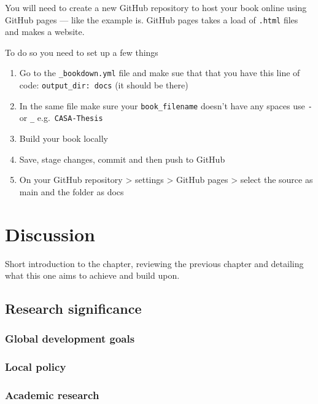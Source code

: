 \documentclass[
  12pt,
  oneside]{book}
\providecommand{\tightlist}{%
  \setlength{\itemsep}{0pt}\setlength{\parskip}{0pt}}
\begin{document}
You will need to create a new GitHub repository to host your book online using GitHub pages --- like the example is. GitHub pages takes a load of \texttt{.html} files and makes a website.

To do so you need to set up a few things

\begin{enumerate}
\def\labelenumi{\arabic{enumi}.}
\tightlist
\item
  Go to the \texttt{\_bookdown.yml} file and make sue that that you have this line of code: \texttt{output\_dir:\ docs} (it should be there)
\item
  In the same file make sure your \texttt{book\_filename} doesn't have any spaces use \texttt{-} or \texttt{\_} e.g.~\texttt{CASA-Thesis}
\item
  Build your book locally
\item
  Save, stage changes, commit and then push to GitHub
\item
  On your GitHub repository \textgreater{} settings \textgreater{} GitHub pages \textgreater{} select the source as main and the folder as docs
\end{enumerate}

\hypertarget{discussion}{%
\chapter{Discussion}\label{discussion}}

Short introduction to the chapter, reviewing the previous chapter and detailing what this one aims to achieve and build upon.

\hypertarget{research-significance}{%
\section{Research significance}\label{research-significance}}

\hypertarget{global-development-goals}{%
\subsection{Global development goals}\label{global-development-goals}}

\hypertarget{local-policy}{%
\subsection{Local policy}\label{local-policy}}

\hypertarget{academic-research}{%
\subsection{Academic research}\label{academic-research}}
\end{document}
